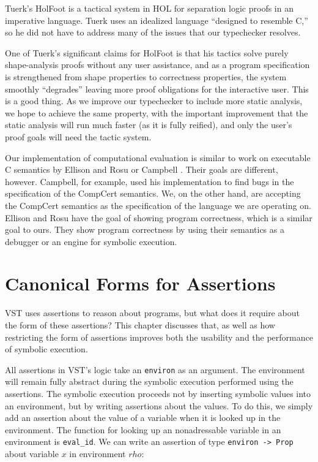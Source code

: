\documentclass{puthesis}
\begin{document}
Tuerk's HolFoot \cite{Tuer09} is a tactical system in HOL for
separation logic proofs in an imperative language.  Tuerk uses an
idealized language ``designed to resemble C,'' so he did not have to
address many of the issues that our typechecker resolves.

One of Tuerk's significant claims for HolFoot is that his tactics
solve purely shape-analysis proofs without any user assistance, and as
a program specification is strengthened from shape properties to
correctness properties, the system smoothly ``degrades'' leaving more
proof obligations for the interactive user.  This is a good thing.  As
we improve our typechecker to include more static analysis, we hope to
achieve the same property, with the important improvement that the
static analysis will run much faster (as it is fully reified), and
only the user's proof goals will need the tactic system.

Our implementation of computational evaluation is similar to work on
executable C semantics by Ellison and Rosu \cite{ellison-rosu-2012-popl} or
Campbell \cite{Campbell-cpp-12}. Their goals are different, however.
Campbell, for example, used his implementation to find bugs in the
specification of the CompCert semantics. We, on the other hand, are accepting
the CompCert semantics as the specification of the language we are operating
on. Ellison and Rosu have the goal of showing program correctness, which is a 
similar goal to ours. They show program correctness by using their semantics as
a debugger or an engine for symbolic execution. 


\chapter{Canonical Forms for Assertions}
\label{ch:canonical}

VST uses assertions to reason about programs, but what does it require
about the form of these assertions? This chapter discusses that, as
well as how restricting the form of assertions improves both the
usability and the performance of symbolic execution.

All assertions in VST's logic take an \lstinline|environ| as an
argument. The environment will remain fully abstract during the
symbolic execution performed using the assertions. The symbolic
execution proceeds not by inserting symbolic values into an
environment, but by writing assertions about the values. To do this,
we simply add an assertion about the value of a variable when it is
looked up in the environment. The function for looking up an
nonadressable variable in an environment is \lstinline|eval_id|. We can
write an assertion of type \lstinline|environ -> Prop| about variable
$x$ in environment $rho$:
\end{document}
